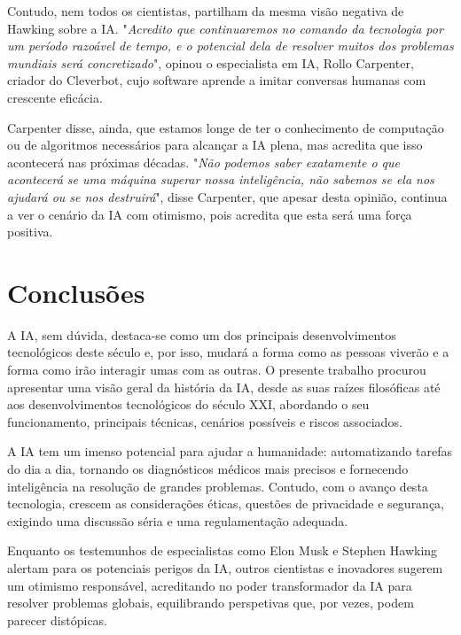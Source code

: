 \documentclass{report}
\begin{document}
Contudo, nem todos os cientistas, partilham da mesma visão negativa de Hawking sobre a \ac{IA}.
"\textit{Acredito que continuaremos no comando da tecnologia por um período razoável de tempo, e o potencial dela de resolver muitos dos problemas mundiais será concretizado}", opinou o especialista em \ac{IA}, Rollo Carpenter, criador do Cleverbot, cujo software aprende a imitar conversas humanas com crescente eficácia.
\vspace{5pt}

Carpenter disse, ainda, que estamos longe de ter o conhecimento de computação ou de algoritmos necessários para alcançar a \ac{IA} plena, mas acredita que isso acontecerá nas próximas décadas.
"\textit{Não podemos saber exatamente o que acontecerá se uma máquina superar nossa inteligência, não sabemos se ela nos ajudará ou se nos destruirá}", disse Carpenter, que apesar desta opinião, continua a ver o cenário da \ac{IA} com otimismo, pois acredita que esta será uma força positiva.



\chapter{Conclusões}
\label{chap.conclusões}
A \ac{IA}, sem dúvida, destaca-se como um dos principais desenvolvimentos tecnológicos deste século e, por isso, mudará a forma como as pessoas viverão e a forma como irão interagir umas com as outras. O presente trabalho procurou apresentar uma visão geral da história da \ac{IA}, desde as suas raízes filosóficas até aos desenvolvimentos tecnológicos do século XXI, abordando o seu funcionamento, principais técnicas, cenários possíveis e riscos associados.
\vspace{5pt}

A \ac{IA} tem um imenso potencial para ajudar a humanidade: automatizando tarefas do dia a dia, tornando os diagnósticos médicos mais precisos e fornecendo inteligência na resolução de grandes problemas. Contudo, com o avanço desta tecnologia, crescem as considerações éticas, questões de privacidade e segurança, exigindo uma discussão séria e uma regulamentação adequada.
\vspace{5pt}

Enquanto os testemunhos de especialistas como Elon Musk e Stephen Hawking alertam para os potenciais perigos da \ac{IA}, outros cientistas e inovadores sugerem um otimismo responsável, acreditando no poder transformador da \ac{IA} para resolver problemas globais, equilibrando perspetivas que, por vezes, podem parecer distópicas.
\vspace{5pt}
\end{document}
